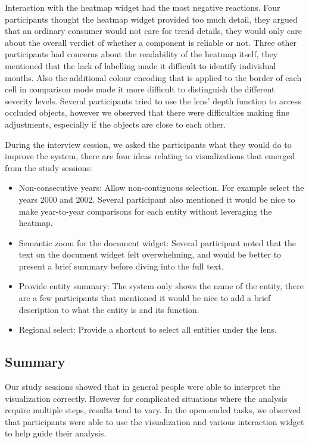Interaction with the heatmap widget had the most negative reactions. Four
participants thought the heatmap widget provided too much detail, they argued
that an ordinary consumer would not care for trend details, they would only care
about the overall verdict of whether a component is reliable or not. Three other
participants had concerns about the readability of the heatmap itself, they
mentioned that the lack of labelling made it difficult to identify individual
months. Also the additional colour encoding that is applied to the border of each
cell in comparison mode made it more difficult to distinguish the different
severity levels. Several participants tried to use the lens' depth function to access
occluded objects, however we observed that there were difficulties making fine
adjustments, especially if the objects are close to each other. 
  
During the interview session, we asked the participants what they would do to
improve the system, there are four ideas relating to visualizations that emerged
from the study sessions:
\begin{itemize}[noitemsep]
  \item Non-consecutive years: Allow non-contiguous selection. For
  example select the years 2000 and 2002. Several participant also mentioned it
  would be nice to make year-to-year comparisons for each entity without
  leveraging the heatmap.
  
  \item Semantic zoom for the document widget: Several participant noted that
  the text on the document widget felt overwhelming, and would be better to
  present a brief summary before diving into the full text.
  
  \item Provide entity summary: The system only shows the name of the entity,
  there are a few participants that mentioned it would be nice to add a brief
  description to what the entity is and its function.
  
  \item Regional select: Provide a shortcut to select all entities under the
  lens.
\end{itemize}
   
  
\subsection{Summary}
Our study sessions showed that in general people were able to interpret the
visualization correctly. However for complicated situations where the analysis
require multiple steps, results tend to vary. In the open-ended tasks, we
observed that participants were able to use the visualization and various
interaction widget to help guide their analysis.

